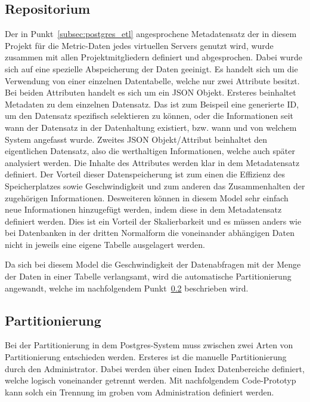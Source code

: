 \subsection{Repositorium}
\label{subsec:postgres_repositorium}
Der in Punkt~\ref{subsec:postgres_etl} angesprochene Metadatensatz der in
diesem Projekt für die Metric-Daten jedes virtuellen Servers genutzt wird,
wurde zusammen mit allen Projektmitgliedern definiert und abgesprochen.
Dabei wurde sich auf eine spezielle Abspeicherung der Daten geeinigt. Es
handelt sich um die Verwendung von einer einzelnen Datentabelle, welche
nur zwei Attribute besitzt. Bei beiden Attributen handelt es sich um ein
JSON Objekt. Ersteres beinhaltet Metadaten zu dem einzelnen Datensatz.
Das ist zum Beispeil eine generierte ID, um den Datensatz spezifisch
selektieren zu können, oder die Informationen seit wann der Datensatz
in der Datenhaltung existiert, bzw. wann und von welchem System angefasst
wurde. Zweites JSON Objekt/Attribut beinhaltet den eigentlichen Datensatz,
also die werthaltigen Informationen, welche auch später analysiert werden.
Die Inhalte des Attributes werden klar in dem Metadatensatz definiert.
Der Vorteil dieser Datenspeicherung ist zum einen die Effizienz des
Speicherplatzes sowie Geschwindigkeit und zum anderen das Zusammenhalten der
zugehörigen Informationen. Desweiteren können in diesem Model sehr einfach neue
Informationen hinzugefügt werden, indem diese in dem Metadatensatz definiert
werden. Dies ist ein Vorteil der Skalierbarkeit und es müssen anders wie bei
Datenbanken in der dritten Normalform die voneinander abhängigen Daten nicht
in jeweils eine eigene Tabelle ausgelagert werden.

Da sich bei diesem Model die Geschwindigkeit der Datenabfragen mit der Menge
der Daten in einer Tabelle verlangsamt, wird die automatische Partitionierung
angewandt, welche im nachfolgendem Punkt~\ref{subsec:postgres_partition}
beschrieben wird.
\nl%

\subsection{Partitionierung}
\label{subsec:postgres_partition}
Bei der Partitionierung in dem Postgres-System muss zwischen zwei Arten von
Partitionierung entschieden werden. Ersteres ist die manuelle Partitionierung
durch den Administrator. Dabei werden über einen Index Datenbereiche definiert,
welche logisch voneinander getrennt werden. Mit nachfolgendem Code-Prototyp
kann solch ein Trennung im groben vom Administration definiert werden.


